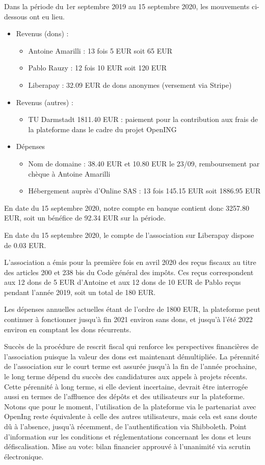\documentclass[a4paper]{article}
\begin{document}
Dans la période du 1er septembre 2019 au 15 septembre 2020, les mouvements ci-dessous ont eu lieu.
\begin{itemize}
\item Revenus (dons) :
  \begin{itemize}
    \item Antoine Amarilli : 13 fois 5 EUR soit 65 EUR
    \item Pablo Rauzy : 12 fois 10 EUR soit 120 EUR
    \item Liberapay : 32.09 EUR de dons anonymes (versement via Stripe)
  \end{itemize}
\item Revenus (autres) :
\begin{itemize}
    \item TU Darmstadt 1811.40 EUR : paiement pour la contribution aux frais de la plateforme dans le cadre du projet OpenING
\end{itemize}
\item Dépenses
  \begin{itemize}
    \item Nom de domaine : 38.40 EUR et 10.80 EUR le 23/09, remboursement par chèque à Antoine Amarilli
    \item Hébergement auprès d'Online SAS : 13 fois 145.15 EUR soit 1886.95 EUR
  \end{itemize}
\end{itemize}

En date du 15 septembre 2020, notre compte en banque contient donc 3257.80 EUR, soit un bénéfice de 92.34 EUR sur la période.

En date du 15 septembre 2020, le compte de l'association sur Liberapay dispose de 0.03 EUR.

L'association a émis pour la première fois en avril 2020 des reçus fiscaux au titre des articles 200 et 238 bis du Code général des impôts. Ces reçus correspondent aux 12 dons de 5 EUR d'Antoine et aux 12 dons de 10 EUR de Pablo reçus pendant l'année 2019, soit un total de 180 EUR.

Les dépenses annuelles actuelles étant de l'ordre de 1800 EUR, la plateforme peut continuer à fonctionner jusqu'à fin 2021 environ sans dons, et jusqu'à l'été 2022 environ en comptant les dons récurrents.


Succès de la procédure de rescrit fiscal qui renforce les perspectives financières de l'association puisque la valeur des dons est maintenant démultipliée. La pérennité de l'association sur le court terme est assurée jusqu'à la fin de l'année prochaine, le long terme dépend du succès des candidatures aux appels à projets récents. Cette pérennité à long terme, si elle devient incertaine, devrait être interrogée aussi en termes de l'affluence des dépôts et des utilisateurs sur la plateforme. 
Notons que pour le moment, l'utilisation de la plateforme via le partenariat avec OpenIng reste équivalente à celle des autres utilisateurs, mais cela est sans doute dû à l'absence, jusqu'à récemment, de l'authentification via Shibboleth. 
Point d'information sur les conditions et réglementations concernant les dons et leurs défiscalisation. 
Mise au vote: bilan financier approuvé à l'unanimité via scrutin électronique.
\end{document}
